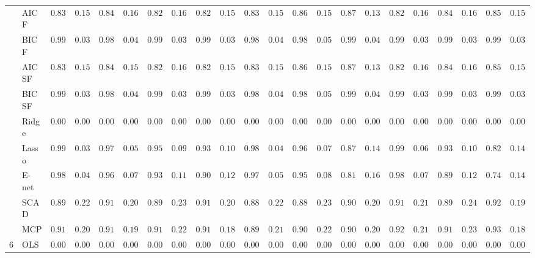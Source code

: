 \begin{tabular}{p{0.2cm}p{1cm}|p{0.6cm}p{0.6cm}|p{0.6cm}p{0.6cm}p{0.6cm}p{0.6cm}p{0.6cm}p{0.6cm}|p{0.6cm}p{0.6cm}p{0.6cm}p{0.6cm}p{0.6cm}p{0.6cm}|p{0.6cm}p{0.6cm}p{0.6cm}p{0.6cm}p{0.6cm}p{0.6cm}}
 & AIC F  & $0.8317$ & $0.1526$ & $0.8467$ & $0.1601$ & $0.8250$ & $0.1698$ & $0.8217$ & $0.1540$ & $0.8383$ & $0.1525$ & $0.8600$ & $0.1530$ & $0.8717$ & $0.1399$ & $0.8250$ & $0.1613$ & $0.8400$ & $0.1640$ & $0.8517$ & $0.1551$ \\
 & BIC F  & $0.9917$ & $0.0365$ & $0.9883$ & $0.0489$ & $0.9933$ & $0.0328$ & $0.9950$ & $0.0371$ & $0.9883$ & $0.0427$ & $0.9850$ & $0.0535$ & $0.9917$ & $0.0435$ & $0.9933$ & $0.0328$ & $0.9917$ & $0.0365$ & $0.9917$ & $0.0365$ \\
 & AIC SF  & $0.8317$ & $0.1526$ & $0.8483$ & $0.1573$ & $0.8250$ & $0.1698$ & $0.8217$ & $0.1540$ & $0.8383$ & $0.1525$ & $0.8600$ & $0.1530$ & $0.8717$ & $0.1399$ & $0.8250$ & $0.1613$ & $0.8400$ & $0.1640$ & $0.8517$ & $0.1551$ \\
 & BIC SF  & $0.9917$ & $0.0365$ & $0.9883$ & $0.0489$ & $0.9933$ & $0.0328$ & $0.9950$ & $0.0371$ & $0.9883$ & $0.0427$ & $0.9850$ & $0.0535$ & $0.9917$ & $0.0435$ & $0.9933$ & $0.0328$ & $0.9917$ & $0.0365$ & $0.9917$ & $0.0365$ \\
 & Ridge  & $0.0000$ & $0.0000$ & $0.0000$ & $0.0000$ & $0.0000$ & $0.0000$ & $0.0000$ & $0.0000$ & $0.0000$ & $0.0000$ & $0.0000$ & $0.0000$ & $0.0000$ & $0.0000$ & $0.0000$ & $0.0000$ & $0.0000$ & $0.0000$ & $0.0000$ & $0.0000$ \\
 & Lasso  & $0.9933$ & $0.0328$ & $0.9767$ & $0.0581$ & $0.9567$ & $0.0966$ & $0.9317$ & $0.1062$ & $0.9883$ & $0.0427$ & $0.9683$ & $0.0738$ & $0.8733$ & $0.1404$ & $0.9900$ & $0.0619$ & $0.9333$ & $0.1059$ & $0.8267$ & $0.1400$ \\
 & E-net  & $0.9850$ & $0.0479$ & $0.9650$ & $0.0796$ & $0.9367$ & $0.1155$ & $0.9050$ & $0.1237$ & $0.9750$ & $0.0598$ & $0.9550$ & $0.0849$ & $0.8167$ & $0.1633$ & $0.9800$ & $0.0760$ & $0.8933$ & $0.1287$ & $0.7467$ & $0.1411$ \\
 & SCAD  & $0.8900$ & $0.2275$ & $0.9100$ & $0.2057$ & $0.8933$ & $0.2375$ & $0.9100$ & $0.2030$ & $0.8833$ & $0.2278$ & $0.8833$ & $0.2363$ & $0.9067$ & $0.2083$ & $0.9150$ & $0.2165$ & $0.8950$ & $0.2458$ & $0.9267$ & $0.1915$ \\
 & MCP  & $0.9117$ & $0.2002$ & $0.9183$ & $0.1961$ & $0.9133$ & $0.2241$ & $0.9100$ & $0.1872$ & $0.8983$ & $0.2183$ & $0.9033$ & $0.2250$ & $0.9083$ & $0.2043$ & $0.9250$ & $0.2111$ & $0.9117$ & $0.2302$ & $0.9317$ & $0.1867$ \\\hline
6 & OLS  & $0.0000$ & $0.0000$ & $0.0000$ & $0.0000$ & $0.0000$ & $0.0000$ & $0.0000$ & $0.0000$ & $0.0000$ & $0.0000$ & $0.0000$ & $0.0000$ & $0.0000$ & $0.0000$ & $0.0000$ & $0.0000$ & $0.0000$ & $0.0000$ & $0.0000$ & $0.0000$ \\

\end{tabular}
